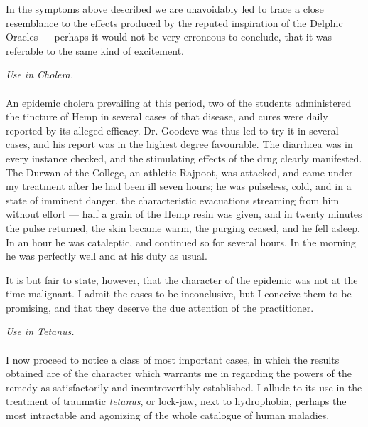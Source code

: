 \documentclass[a4paper, 11pt, oneside, polutonikogreek, english]{article}
\begin{document}
In the symptoms above described we are unavoidably led to trace a close resemblance to the effects produced by the reputed inspiration of the Delphic Oracles --- perhaps it would not be very erroneous to conclude, that it was referable to the same kind of excitement.
\begin{center}
\emph{Use in Cholera.}
\end{center}
\paragraph{}
An epidemic cholera prevailing at this period, two of the students administered the tincture of Hemp in several cases of that disease, and cures were daily reported by its alleged efficacy. Dr. Goodeve was thus led to try it in several cases, and his report was in the highest degree favourable. The diarrhœa was in every instance checked, and the stimulating effects of the drug clearly manifested. The Durwan of the College, an athletic Rajpoot, was attacked, and came under my treatment after he had been ill seven hours; he was pulseless, cold, and in a state of imminent danger, the characteristic evacuations streaming from him without effort --- half a grain of the Hemp resin was given, and in twenty minutes the pulse returned, the skin became warm, the purging ceased, and he fell asleep. In an hour he was cataleptic, and continued so for several hours. In the morning he was perfectly well and at his duty as usual.

It is but fair to state, however, that the character of the epidemic was not at the time malignant. I admit the cases to be inconclusive, but I conceive them to be promising, and that they deserve the due attention of the practitioner.
\begin{center}
\emph{Use in Tetanus.}
\end{center}
\paragraph{}
I now proceed to notice a class of most important cases, in which the results obtained are of the character which warrants me in regarding the powers of the remedy as satisfactorily and incontrovertibly established. I allude to its use in the treatment of traumatic \emph{tetanus}, or lock-jaw, next to hydrophobia, perhaps the most intractable and agonizing of the whole catalogue of human maladies.
\end{document}
